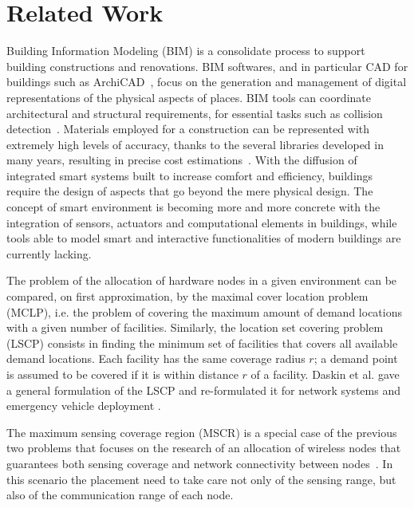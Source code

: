 \section{Related Work}\label{sec:related}
Building Information Modeling (BIM) is a consolidate process to support building constructions and renovations. BIM softwares, and in particular CAD for buildings such as ArchiCAD~\cite{Archicad}, focus on the generation and management of digital representations of the physical aspects of places. BIM tools can coordinate architectural and structural requirements, for essential tasks such as collision detection~\cite{Zhang2011}. Materials employed for a construction can be represented with extremely high levels of accuracy, thanks to the several libraries developed in many years, resulting in precise cost estimations~\cite{Xu2014}. With the diffusion of integrated smart systems built to increase comfort and efficiency, buildings require the design of aspects that go beyond the mere physical design. The concept of smart environment is becoming more and more concrete with the integration of sensors, actuators and computational elements in buildings, while tools able to model smart and interactive functionalities of modern buildings are currently lacking.

The problem of the allocation of hardware nodes in a given environment can be compared, on first approximation, by the maximal cover location problem (MCLP), i.e. the problem of covering the maximum amount of demand locations with a given number of facilities. Similarly, the location set covering problem (LSCP) consists in finding the minimum set of facilities that covers all available demand locations. Each facility has the same coverage radius \(r\); a demand point is assumed to be covered if it is within distance \(r\) of a facility. Daskin et al. gave a general formulation of the LSCP \cite{Daskin1983} and re-formulated it for network systems and emergency vehicle deployment \cite{Daskin1981}.

The maximum sensing coverage region (MSCR) is a special case of the previous two problems that focuses on the research of an allocation of wireless nodes that guarantees both sensing coverage and network connectivity between nodes~\cite{VinhTranQuang, So2005}. In this scenario the placement need to take care not only of the sensing range, but also of the communication range of each node.


